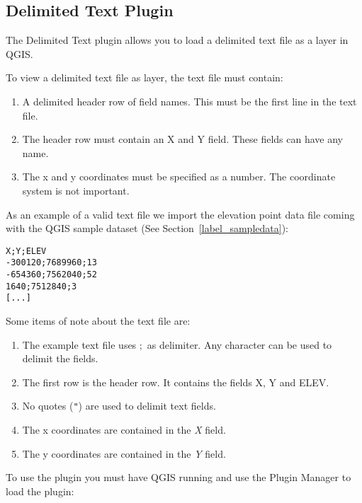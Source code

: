 
\subsection{Delimited Text Plugin}\label{label_dltext}    


The Delimited Text plugin allows you to load a delimited text file as a layer in QGIS. 


To view a delimited text file as layer, the text file must contain:

\begin{enumerate}      
\item A delimited header row of field names. This must be the first line in the text file.
\item The header row must contain an X and Y field. These fields can have any name.
\item The x and y coordinates must be specified as a number. The coordinate system is not important.
\end{enumerate}

As an example of a valid text file we import the elevation point data file 
 coming with the QGIS sample dataset (See Section~\ref{label_sampledata}):

\begin{verbatim} 
X;Y;ELEV
-300120;7689960;13
-654360;7562040;52
1640;7512840;3
[...]
\end{verbatim}

Some items of note about the text file are:

\begin{enumerate}
\item The example text file uses \mbox{$;$} as delimiter. Any character can be used to delimit the fields.
\item The first row is the header row. It contains the fields X, Y and ELEV.
\item No quotes ({\tt{}"{}}) are used to delimit text fields.
\item The x coordinates are contained in the {\em X} field.
\item The y coordinates are contained in the {\em Y} field.
\end{enumerate}

To use the plugin you must have QGIS running and use the Plugin Manager to load the plugin:

